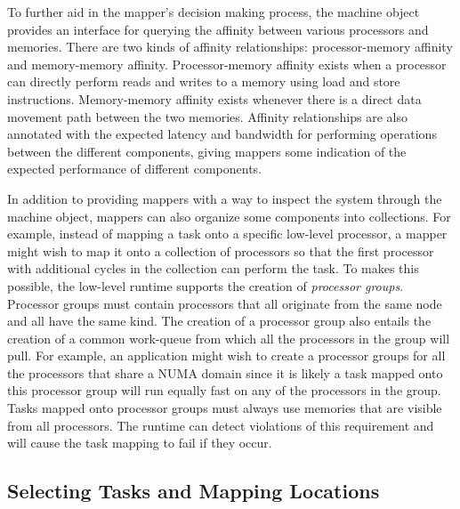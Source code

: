 To further aid in the mapper's decision making process, 
the machine object provides an interface for querying 
the affinity between various processors and memories. 
There are two kinds of affinity relationships:
processor-memory affinity and memory-memory affinity.
Processor-memory affinity exists when a processor can
directly perform reads and writes to a memory using
load and store instructions. Memory-memory affinity 
exists whenever there is a direct data movement
path between the two memories. Affinity relationships
are also annotated with the expected latency and 
bandwidth for performing operations between the 
different components, giving mappers some indication
of the expected performance of different components.

In addition to providing mappers with a way to inspect
the system through the machine object, mappers can also
organize some components into collections.  For example,
instead of mapping a task onto a specific low-level
processor, a mapper might wish to map it onto a collection
of processors so that the first processor with additional
cycles in the collection can perform the task. To makes
this possible, the low-level runtime supports the 
creation of {\em processor groups}.  Processor groups
must contain processors that all originate from the same
node and all have the same kind.  The creation of a 
processor group also entails the creation of a common
work-queue from which all the processors in the group
will pull. For example, an application might wish to
create a processor groups for all the processors that 
share a NUMA domain since it is likely a task mapped
onto this processor group will run equally fast on 
any of the processors in the group. Tasks mapped onto 
processor groups must always use memories that are 
visible from all processors.  The runtime can detect
violations of this requirement and will cause the
task mapping to fail if they occur.

\subsection{Selecting Tasks and Mapping Locations}
\label{subsec:mapselect}


